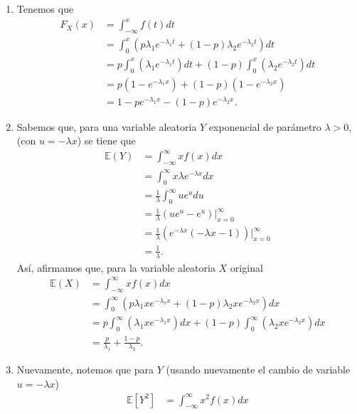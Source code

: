 \documentclass[12pt,a4paper]{article}
\theoremstyle{plain}
\theoremstyle{definition}
\theoremstyle{remark}
\newcommand{\E}{\mathbb{E}}
\begin{document}
\begin{enumerate}
    \item[(i)] Tenemos que
        \begin{align*}
            F_X(x) &= \int_{-\infty}^{x}f(t)dt \\
            &= \int_{0}^{x}\left(p\lambda_1e^{-\lambda_1t} + (1 - p) \lambda_2e^{-\lambda_2t}\right)dt \\
            &= p\int_{0}^{x}\left(\lambda_1e^{-\lambda_1t}\right)dt + (1-p)\int_{0}^{x}\left(\lambda_2e^{-\lambda_2t}\right)dt \\
            &= p(1-e^{-\lambda_1 x}) + (1-p)(1-e^{-\lambda_2 x}) \\
            &= 1 - pe^{-\lambda_1 x} - (1-p)e^{-\lambda_2 x}.
        \end{align*}
    \item[(ii)] Sabemos que, para una variable aleatoria $Y$ exponencial de parámetro $\lambda > 0$, (con $u=-\lambda x$) se tiene que
        \begin{align*}
            \E(Y) &= \int_{-\infty}^{\infty}xf(x)dx \\
            &= \int_{0}^{\infty}x\lambda e^{-\lambda x}dx \\
            &= \frac{1}{\lambda}\int_{0}^{\infty}ue^udu \\
            &= \frac{1}{\lambda}\left(ue^u-e^u\right)\Big|_{x=0}^\infty \\
            &= \frac{1}{\lambda}\left(e^{-\lambda x}(-\lambda x-1)\right)\Big|_{x=0}^\infty \\
            &= \frac{1}{\lambda}.
        \end{align*}
        Así, afirmamos que, para la variable aleatoria $X$ original
        \begin{align*}
            \E(X) &= \int_{-\infty}^{\infty}xf(x)dx \\
            &= \int_{0}^{\infty}\left(p\lambda_1xe^{-\lambda_1x} + (1 - p) \lambda_2xe^{-\lambda_2x}\right)dx \\
            &= p\int_{0}^{\infty}\left(\lambda_1xe^{-\lambda_1x}\right)dx + (1-p)\int_{0}^{\infty}\left(\lambda_2xe^{-\lambda_2x}\right)dx \\
            &= \frac{p}{\lambda_1} + \frac{1-p}{\lambda_2}.
        \end{align*}
    \item[(iii)] Nuevamente, notemos que para $Y$ (usando nuevamente el cambio de variable $u=-\lambda x$)
        \begin{align*}
            \E[Y^2] &= \int_{-\infty}^{\infty}x^2f(x)dx \\

\end{align*}
\end{enumerate}
\end{document}
